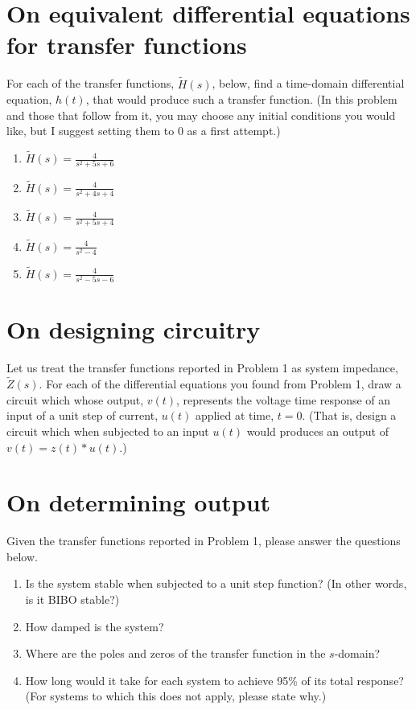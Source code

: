 \documentclass[11pt]{book}
\begin{document}
\section{On equivalent differential equations for transfer functions}
For each of the transfer functions, $\tilde{H}(s)$, below, find a time-domain differential equation, $h(t)$, that would produce such a transfer function. (In this problem and those that follow from it, you may choose any initial conditions you would like, but I suggest setting them to 0 as a first attempt.)
\begin{enumerate}
	\item $\tilde{H}(s) = \frac{4}{s^2+5s+6}$
	\item $\tilde{H}(s) = \frac{4}{s^2+4s+4}$
	\item $\tilde{H}(s) = \frac{4}{s^2+5s+4}$
	\item $\tilde{H}(s) = \frac{4}{s^2-4}$
	\item $\tilde{H}(s) = \frac{4}{s^2-5s-6}$
\end{enumerate}

\newpage
\section{On designing circuitry}
Let us treat the transfer functions reported in Problem 1 as system impedance, $\tilde{Z}(s)$.
For each of the differential equations you found from Problem 1, draw a circuit which whose output, $v(t)$, represents the voltage time response of an input of a unit step of current, $u(t)$ applied at time, $t = 0$. (That is, design a circuit which when subjected to an input $u(t)$ would produces an output of $v(t) = z(t)*u(t)$.)

\section{On determining output}
Given the transfer functions reported in Problem 1, please answer the questions below.
\begin{enumerate}
	\item Is the system stable when subjected to a unit step function? (In other words, is it BIBO stable?)
	\item How damped is the system?
	\item Where are the poles and zeros of the transfer function in the $s$-domain?
	\item How long would it take for each system to achieve 95\% of its total response? (For systems to which this does not apply, please state why.)
\end{enumerate}
\end{document}
